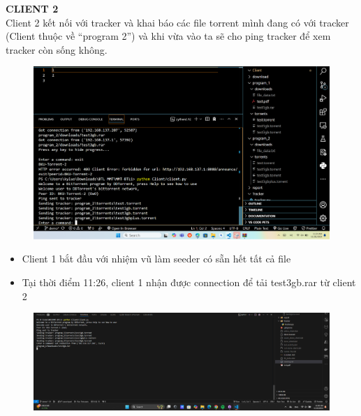 \documentclass[a4paper]{article}
\begin{document}
\noindent \textbf{CLIENT 2}\\
Client 2 kết nối với tracker và khai báo các file torrent mình đang có với tracker (Client thuộc về “program 2”) và khi vừa vào ta sẽ cho ping tracker để xem tracker còn sống không.\\
\begin{figure}[H]
    \centering
    \includegraphics[width=1\textwidth]{images/8.png}
    \captionsetup{labelformat=empty}
\end{figure}
\begin{itemize}
    \item Client 1 bắt đầu với nhiệm vũ làm seeder có sẵn hết tất cả file
    \item Tại thời điểm 11:26, client 1 nhận được connection để tải test3gb.rar từ client 2
\end{itemize}
\begin{figure}[H]
    \centering
    \includegraphics[width=1\textwidth]{images/9.png}
    \captionsetup{labelformat=empty}
\end{figure}
\end{document}
